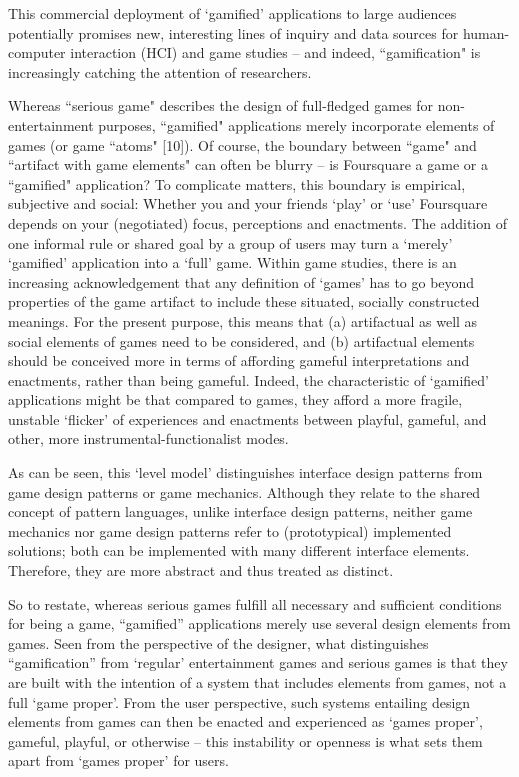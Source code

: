 This commercial deployment of `gamified' applications to large audiences potentially promises new, interesting lines of inquiry and data sources for human-computer interaction (HCI) and game studies – and indeed, ``gamification" is increasingly catching the attention of researchers.

Whereas ``serious game" describes the design of full-fledged games for non-entertainment purposes, ``gamified" applications merely incorporate elements of games (or game ``atoms" [10]). Of course, the boundary between ``game" and ``artifact with game elements" can often be blurry – is Foursquare a game or a ``gamified" application? To complicate matters, this boundary is empirical, subjective and social: Whether you and your friends `play' or `use' Foursquare depends on your (negotiated) focus, perceptions and enactments. The addition of one informal rule or shared goal by a group of users may turn a `merely' `gamified' application into a `full' game. Within game studies, there is an increasing acknowledgement that any definition of `games' has to go beyond properties of the game artifact to include these situated, socially constructed meanings. For the present purpose, this means that (a) artifactual as well as social elements of games need to be considered, and (b) artifactual elements should be conceived more in terms of affording gameful interpretations and enactments, rather than being gameful. Indeed, the characteristic of `gamified' applications might be that compared to games, they afford a more fragile, unstable `flicker' of experiences and enactments between playful, gameful, and other, more instrumental-functionalist modes.


As can be seen, this ‘level model’ distinguishes interface design patterns from game design patterns or game mechanics. Although they relate to the shared concept of pattern languages, unlike interface design patterns, neither game mechanics nor game design patterns refer to (prototypical) implemented solutions; both can be implemented with many different interface elements. Therefore, they are more abstract and thus treated as distinct.

So to restate, whereas serious games fulfill all necessary and sufficient conditions for being a game, “gamified” applications merely use several design elements from games. Seen from the perspective of the designer, what distinguishes “gamification” from ‘regular’ entertainment games and serious games is that they are built with the intention of a system that includes elements from games, not a full ‘game proper’. From the user perspective, such systems entailing design elements from games can then be enacted and experienced as ‘games proper’, gameful, playful, or otherwise – this instability or openness is what sets them apart from ‘games proper’ for users.


